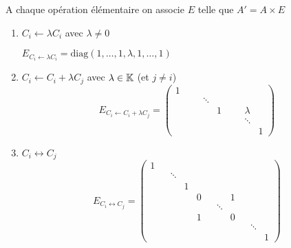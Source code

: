 \begin{frame}
 A chaque opération élémentaire on associe $E$ telle que $A'=A\times E$

\begin{enumerate}
  \item\pause  $C_i \leftarrow \lambda C_i$ avec $\lambda \neq 0$
  
  $E_{C_i \leftarrow \lambda C_i} = \text{diag}(1,\ldots,1,\lambda,1,\ldots,1)$
  \item\pause  $C_i \leftarrow C_i+\lambda C_j$ avec $\lambda \in \mathbb{K}$ (et $j\neq i$)  
  \[
E_{C_i \leftarrow C_i+\lambda C_j} = \left( \begin{smallmatrix}
1 \\ &&& \ddots \\ &&&&1 &&& \lambda  \\ 
 &&&&&&& \ddots \\ &&&&&&&& 1
\end{smallmatrix} \right)
\]
  \item\pause  $C_i \leftrightarrow C_j$
\[
E_{C_i \leftrightarrow C_j} = \left( \begin{smallmatrix}
1 \\ && \ddots  \\ &&& 1 \\ &&&& 0 &&& 1 \\ &&&&&& \ddots  \\ &&&& 1 &&& 0 \\
&&&&&&&&& \ddots \\ &&&&&&&&&& 1
\end{smallmatrix} \right)
\]
\end{enumerate}  

\end{frame}


